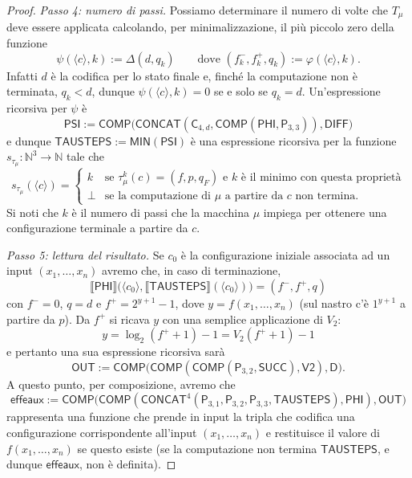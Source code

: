 \begin{proof}
\medskip
\noindent\emph{Passo 4: numero di passi.}
Possiamo determinare il numero di volte che $T_\mu$ deve essere applicata calcolando, per minimalizzazione, il più piccolo zero della funzione
\[
\psi(\langle c\rangle,k):=\Delta(d,q_k)\qquad\text{dove }(f_k^-,f_k^+,q_k):=\varphi(\langle c\rangle,k).
\]
Infatti $d$ è la codifica per lo stato finale e, finché la computazione non è terminata, $q_k<d$, dunque $\psi(\langle c\rangle,k)=0$ se e solo se $q_k=d$. Un'espressione ricorsiva per $\psi$ è
\[
\mathsf{PSI}:=\mathsf{COMP}\bigl(\mathsf{CONCAT}(\mathsf C_{4,d},\mathsf{COMP}(\mathsf{PHI},\mathsf P_{3,3})),\mathsf{DIFF}\bigr)
\]
e dunque $\mathsf{TAUSTEPS}:=\mathsf{MIN}(\mathsf{PSI})$ è una espressione ricorsiva per la funzione $s_{\tau_\mu}\colon\mathbb N^3\to\mathbb N$ tale che
\[
s_{\tau_\mu}(\langle c\rangle)=
\begin{cases}
k & \text{se } \tau_\mu^k(c)=(f,p,q_F)\text{ e } k \text{ è il minimo con questa proprietà}\\
\bot & \text{se la computazione di $\mu$ a partire da $c$ non termina.}
\end{cases}
\]
Si noti che $k$ è il numero di passi che la macchina $\mu$ impiega per ottenere una configurazione terminale a partire da $c$.

\medskip
\noindent\emph{Passo 5: lettura del risultato.}
Se $c_0$ è la configurazione iniziale associata ad un input $(x_1,\dots,x_n)$ avremo che, in caso di terminazione,
\[
\llbracket\mathsf{PHI}\rrbracket\bigl(\langle c_0\rangle,\llbracket\mathsf{TAUSTEPS}\rrbracket(\langle c_0\rangle)\bigr)=(f^-,f^+,q)
\]
con $f^-=0$, $q=d$ e $f^+=2^{y+1}-1$, dove $y=f(x_1,\dots,x_n)$ (sul nastro c'è $1^{y+1}$ a partire da $p$). Da $f^+$ si ricava $y$ con una semplice applicazione di $V_2$:
\[
y=\log_2(f^++1)-1=V_2(f^++1)-1
\]
e pertanto una sua espressione ricorsiva sarà
\[
\mathsf{OUT}:=\mathsf{COMP}\bigl(\mathsf{COMP}(\mathsf{COMP}(\mathsf P_{3,2},\mathsf{SUCC}),\mathsf{V2}),\mathsf D\bigr).
\]
A questo punto, per composizione, avremo che
\[
\mathsf{effeaux}:=\mathsf{COMP}\bigl(\mathsf{COMP}(\mathsf{CONCAT}^4(\mathsf P_{3,1},\mathsf P_{3,2},\mathsf P_{3,3},\mathsf{TAUSTEPS}),\mathsf{PHI}),\mathsf{OUT}\bigr)
\]
rappresenta una funzione che prende in input la tripla che codifica una configurazione corrispondente all'input $(x_1,\dots,x_n)$ e restituisce il valore di $f(x_1,\dots,x_n)$ se questo esiste (se la computazione non termina $\mathsf{TAUSTEPS}$, e dunque $\mathsf{effeaux}$, non è definita).


\end{proof}
